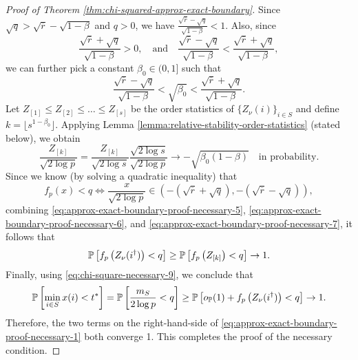 \begin{proof}[Proof of Theorem \ref{thm:chi-squared-approx-exact-boundary}]
Since $\sqrt{q}>\sqrt{\overline{r}}-\sqrt{1-\beta}$ and $q>0$, we have
$\frac{\sqrt{\overline{r}}-\sqrt{q}}{\sqrt{1-\beta}}<1$.
Also, since
$$
    \frac{\sqrt{\overline{r}}+\sqrt{q}}{\sqrt{1-\beta}}>0,
    \quad\text{and}\quad
    \frac{\sqrt{\overline{r}}-\sqrt{q}}{\sqrt{1-\beta}} < \frac{\sqrt{\overline{r}}+\sqrt{q}}{\sqrt{1-\beta}},
$$
we can further pick a constant $\beta_0\in(0,1]$ such that
\begin{equation} \label{eq:approx-exact-boundary-proof-necessary-5}
    \frac{\sqrt{\overline{r}}-\sqrt{q}}{\sqrt{1-\beta}} 
    < \sqrt{\beta_0} < 
    \frac{\sqrt{\overline{r}}+\sqrt{q}}{\sqrt{1-\beta}}.
\end{equation}
Let $Z_{[1]}\le Z_{[2]}\le\ldots\le Z_{[s]}$ be the order statistics of 
$\{Z_\nu(i)\}_{i\in S}$ and define $k=\lfloor s^{1-\beta_0}\rfloor$.
Applying Lemma \ref{lemma:relative-stability-order-statistics} (stated below), we obtain
\begin{equation} \label{eq:approx-exact-boundary-proof-necessary-6}
    \frac{Z_{[k]}}{\sqrt{2\log{p}}}
    = \frac{Z_{[k]}}{\sqrt{2\log{s}}} \frac{\sqrt{2\log{s}}}{\sqrt{2\log{p}}} 
    \to -\sqrt{\beta_0(1-\beta)}
    \quad\text{in probability}.
\end{equation}
Since we know (by solving a quadratic inequality) that
\begin{equation} \label{eq:approx-exact-boundary-proof-necessary-7}
    f_p(x)<q \iff \frac{x}{\sqrt{2\log{p}}} \in \left(-(\sqrt{\overline{r}}+\sqrt{q}), -(\sqrt{\overline{r}}-\sqrt{q})\right),
\end{equation}
combining \eqref{eq:approx-exact-boundary-proof-necessary-5}, \eqref{eq:approx-exact-boundary-proof-necessary-6}, and 
\eqref{eq:approx-exact-boundary-proof-necessary-7}, it follows that
\begin{equation*}
    \P\left[ f_p\left(Z_\nu(i^\dagger)\right) < q \right] \ge \P\left[ f_p\left(Z_{[k]}\right) < q \right] \to 1.
\end{equation*}
Finally, using \eqref{eq:chi-square-necessary-9}, we conclude that 
$$
\P\left[\min_{i\in S}x(i)<t^*\right] = 
\P\left[\frac{m_{S}}{2\log{p}} < q\right] \ge
\P\left[o_\P(1) + f_p\left(Z_\nu(i^\dagger)\right) < q \right] \to 1.
$$
Therefore, the two terms on the right-hand-side of \eqref{eq:approx-exact-boundary-proof-necessary-1} both converge 1. 
This completes the proof of the necessary condition.
\end{proof}

